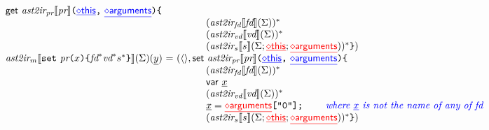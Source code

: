\[\begin{array}{l@{~}l@{~}l}
{\sf get} \ \atoiPRfd{\prop} \verb+(+{\inblue\newvar{this}}\verb+,+\ {\inblue\newvar{arguments}}\verb+)+
\verb+{+\\
&&\quad\quad\quad(\atoiFDfd{\fd})^*\\
&&\quad\quad\quad(\atoiVDf{\vd}\env)^*\\
&&\quad\quad\quad(\atoiSf{\stmt}{\env; {\inred\newvar{this}}; {\inred\newvar{arguments}}})^*
\verb+}+
)
\\

\atoiM\lbr {\tt set} \ \prop \verb+(+x \verb+){+ \fd^* \vd^* \stmt^* \verb+}+  \rbr(\env)(\ir{y})
&=& (
\langle\rangle,

{\sf set} \ \atoiPRfd{\prop} \verb+(+{\inblue\newvar{this}}\verb+,+\ {\inblue\newvar{arguments}}\verb+)+
\verb+{+\\
&&\quad\quad\quad(\atoiFDfd{\fd})^*\\
&&\quad\quad\quad{\sf var}\ \ir{x}\\
&&\quad\quad\quad(\atoiVDf{\vd}\env)^*\\
&&\quad\quad\quad
\ir{x} = {\inred\newvar{arguments}}\verb+["0"];+
\quad\note{where \ir{x} is not the name of any of \mbox{fd}}\\
&&\quad\quad\quad(\atoiSf{\stmt}{\env; {\inred\newvar{this}}; {\inred\newvar{arguments}}})^*
\verb+}+
)
\end{array}
\]
